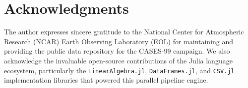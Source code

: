 \section*{Acknowledgments}
The author expresses sincere gratitude to the National Center for Atmospheric Research (NCAR) Earth Observing Laboratory (EOL) for maintaining and providing the public data repository for the CASES-99 campaign. We also acknowledge the invaluable open-source contributions of the Julia language ecosystem, particularly the \texttt{LinearAlgebra.jl}, \texttt{DataFrames.jl}, and \texttt{CSV.jl} implementation libraries that powered this parallel pipeline engine.




